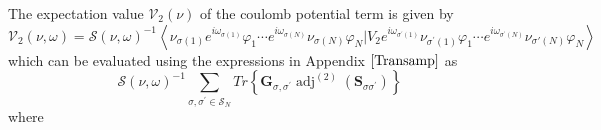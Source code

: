 \documentclass[aps,preprint]{revtex4}%
\begin{document}
The expectation value $\mathcal{V}_{2}\left(  \nu\right)  $ of the coulomb
potential term is given by
\begin{equation}
\mathcal{V}_{2}\left(  \nu,\omega\right)  =\mathcal{S}\left(  \nu
,\omega\right)  ^{-1}\left\langle \nu_{\sigma\left(  1\right)  }%
e^{i\omega_{\sigma\left(  1\right)  }}\varphi_{1}\cdots e^{i\omega
_{\sigma\left(  N\right)  }}\nu_{\sigma\left(  N\right)  }\varphi
_{N}\left\vert V_{2}\right.  e^{i\omega_{\sigma^{\prime}\left(  1\right)  }%
}\nu_{\sigma^{\prime}\left(  1\right)  }\varphi_{1}\cdots e^{i\omega
_{\sigma^{\prime}\left(  N\right)  }}\nu_{\sigma\prime\left(  N\right)
}\varphi_{N}\right\rangle
\end{equation}
which can be evaluated using the expressions in Appendix $\ref{Transamp}$ as
\begin{equation}
\mathcal{S}\left(  \nu,\omega\right)  ^{-1}%
{\textstyle\sum\limits_{\sigma,\sigma^{\prime}\in\mathcal{S}_{N}}}
Tr\left\{  \mathbf{G}_{\sigma,\sigma^{\prime}}\operatorname{adj}^{\left(
2\right)  }\left(  \mathbf{S}_{\sigma\sigma^{\prime}}\right)  \right\}
\end{equation}
where
\end{document}
